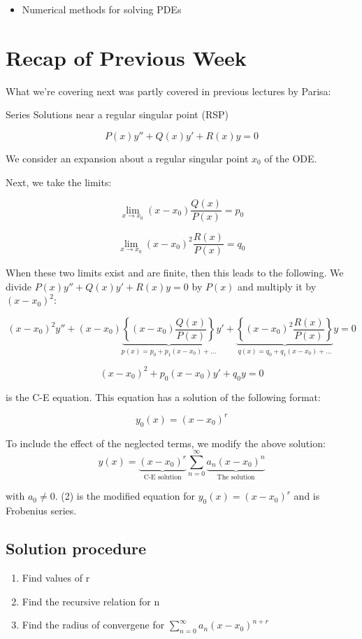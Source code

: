 \documentclass{article}
\begin{document}
\begin{itemize}
    \item Numerical methods for solving PDEs
\end{itemize}

\section{Recap of Previous Week}

What we're covering next was partly covered in previous lectures by Parisa:

\hfill

Series Solutions near a regular singular point (RSP)

$$ P(x) y'' + Q(x) y' + R(x)y = 0$$

We consider an expansion about a regular singular point $x_0$ of the ODE. 

Next, we take the limits:

$$\lim_{x \to x_0} (x - x_0) \frac{Q(x)}{P(x)} = p_0$$

$$\lim_{x \to x_0} (x - x_0)^2 \frac{R(x)}{P(x)} = q_0$$

When these two limits exist and are finite, then this leads to the following. We divide $ P(x) y'' + Q(x) y' + R(x)y = 0$ by $P(x)$ and multiply it by $(x - x_0)^2$:

$$(x-x_0)^2 y'' + (x - x_0) \underbrace{\left\{(x - x_0) \frac{Q(x)}{P(x)} \right\}}_{p(x) = p_0 + p_1 (x - x_0) + ...} y' + \underbrace{\left\{ (x - x_0)^2 \frac{R(x)}{P(x)} \right\}}_{q(x) = q_0 + q_1 (x - x_0) + ...} y = 0$$


$$(x - x_0)^2 + p_0 (x - x_0) y' + q_0 y = 0$$

is the C-E equation. This equation has a solution of the following format:

$$y_0(x) = (x - x_0)^r$$

To include the effect of the neglected terms, we modify the above solution:
$$y(x) = \underbrace{(x - x_0)^r}_{\text{C-E solution}} \sum_{n = 0}^{\infty} \underbrace{a_n (x - x_0)^n}_{\text{The solution}}$$


with $a_0 \neq 0$. (2) is the modified equation for $y_0(x) = (x - x_0)^r$ and is  Frobenius series. 

\subsection{Solution procedure}

\begin{enumerate}
    \item Find values of r
    \item Find the recursive relation for n
    \item Find the radius of convergene for $\sum_{n = 0}^{\infty} a_n (x - x_0)^{n +r}$
\end{enumerate}
\end{document}

